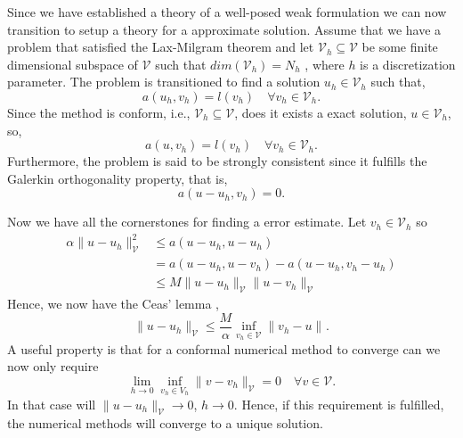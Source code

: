 Since we have established a theory of a well-posed weak formulation we can now transition to setup a theory for a approximate solution. Assume that we have a problem that satisfied the Lax-Milgram theorem and let $\mathcal{V} _{h} \subseteq  \mathcal{V} $  be
some finite dimensional subspace of $\mathcal{V} $ such that $dim\left( \mathcal{V} _{h} \right) =N_{h}$ , where $h$  is a discretization parameter. The problem is transitioned to find a solution $u_{h} \in  \mathcal{V}_{h}$ such that,
$$a\left( u_{h},v_{h} \right)  =
l\left( v_{h} \right) \quad  \forall v_{h} \in \mathcal{V} _{h} .$$
Since the method is conform, i.e., $\mathcal{V} _{h} \subseteq  \mathcal{V} $, does it exists a exact solution, $u \in  \mathcal{V} _{h}$, so, \[
a \left( u, v_{h} \right)  = l\left( v_{h} \right)  \quad  \forall v_{h} \in  \mathcal{V} _{h}.
\]
Furthermore, the problem is said to be strongly consistent since it fulfills the Galerkin orthogonality property, that is,
$$ a\left( u -u_{h} , v_{h} \right)  =0.$$

Now we have all the cornerstones for finding a error estimate. Let $v_{h} \in  \mathcal{V} _{h}$ so
\[
    \begin{split}
\alpha \| u -u_{h} \|_{ \mathcal{V}  }^{ 2 } & \le  a\left( u - u_{h}, u - u_{h}  \right)    \\
&= a\left( u - u_{h}, u -v_{h} \right) - a\left( u -u_{h}, v_{h} - u_{h} \right)  \\
 &  \le  M \| u - u_{h} \|_{ \mathcal{V}  }^{  }  \| u - v_{h} \|_{ \mathcal{V}  }^{  }
    \end{split}
\]
Hence, we now have the Ceas' lemma \cite{quartdiff}, \[
\| u - u_{h} \|_{ \mathcal{V}  }^{  }  \le  \frac{M}{\alpha } \inf_{v_{h} \in \mathcal{V} } \|  v_{h} - u \|_{  }^{  }.
\]
A useful property is that for a conformal numerical method to converge can we now only require \[
\lim_{h \to 0}  \inf_{v_{h} \in  V_{h}}  \| v - v_{h} \|_{ \mathcal{V }  }^{  } = 0 \quad  \forall v \in \mathcal{V}.
\]
In that case will $\| u - u_{h} \|_{ \mathcal{V}  }^{  }  \to  0$, $h \to  0$. Hence, if this requirement is fulfilled, the numerical methods will converge to a unique solution.



